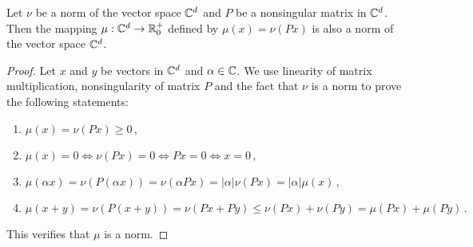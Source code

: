 

\begin{lem}
\label{lem:vectNorm}
Let $\nu$ be a norm of the vector space $\mathbb{C}^d$ and $P$ be a nonsingular matrix in $\mathbb{C}^d$. Then the mapping $\mu:\mathbb{C}^d\rightarrow \mathbb{R}^+_0$ defined by $\mu(x)=\nu(Px)$ is also a norm of the vector space $\mathbb{C}^d$.
\end{lem}
\begin{proof}
Let $x$ and $y$ be vectors in $\mathbb{C}^d$ and $\alpha\in \mathbb{C}$.  We use linearity of matrix multiplication, nonsingularity of matrix $P$ and the fact that $\nu$ is a norm to prove the following statements:
\begin{enumerate}
    \item $\mu(x)=\nu(Px)\geq 0\,,$
    \item $\mu(x)=0 \iff \nu(Px)=0 \iff Px=0 \iff x=0\,,$
    \item $\mu(\alpha x)=\nu(P(\alpha x))=\nu(\alpha Px)=|\alpha|\nu(Px)=|\alpha|\mu(x)\,,$
    \item $\mu(x+y)=\nu(P(x+y))=\nu(Px+Py)\leq \nu(Px)+\nu(Py)=\mu(Px)+\mu(Py)\,.$
\end{enumerate}
This  verifies that $\mu$ is a norm.
\end{proof}



